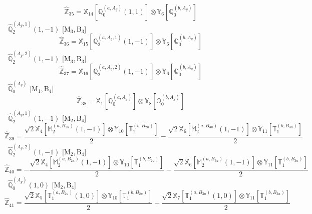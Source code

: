 \documentclass[fleqn,10pt,landscape]{article}
\begin{document}
\begin{itemize}
\begin{dmath*}
\hat{\mathbb{Z}}_{35}=\mathbb{X}_{14}[\mathbb{Q}_{0}^{(a,A_{g})}(1,1)] \otimes\mathbb{Y}_{6}[\mathbb{Q}_{0}^{(b,A_{g})}]
\end{dmath*}
\vspace{4mm}
\noindent {} $\,\,\,\hat{\mathbb{Q}}_{2}^{(A_{g},1)}(1,-1)$ [M$_{3}$,\,B$_{3}$]
\begin{dmath*}
\hat{\mathbb{Z}}_{36}=\mathbb{X}_{15}[\mathbb{Q}_{2}^{(a,A_{g},1)}(1,-1)] \otimes\mathbb{Y}_{6}[\mathbb{Q}_{0}^{(b,A_{g})}]
\end{dmath*}
\vspace{4mm}
\noindent {} $\,\,\,\hat{\mathbb{Q}}_{2}^{(A_{g},2)}(1,-1)$ [M$_{3}$,\,B$_{3}$]
\begin{dmath*}
\hat{\mathbb{Z}}_{37}=\mathbb{X}_{16}[\mathbb{Q}_{2}^{(a,A_{g},2)}(1,-1)] \otimes\mathbb{Y}_{6}[\mathbb{Q}_{0}^{(b,A_{g})}]
\end{dmath*}
\vspace{4mm}
\noindent {} $\,\,\,\hat{\mathbb{Q}}_{0}^{(A_{g})}$ [M$_{1}$,\,B$_{4}$]
\begin{dmath*}
\hat{\mathbb{Z}}_{38}=\mathbb{X}_{1}[\mathbb{Q}_{0}^{(a,A_{g})}] \otimes\mathbb{Y}_{8}[\mathbb{Q}_{0}^{(b,A_{g})}]
\end{dmath*}
\vspace{4mm}
\noindent {} $\,\,\,\hat{\mathbb{Q}}_{2}^{(A_{g},1)}(1,-1)$ [M$_{2}$,\,B$_{4}$]
\begin{dmath*}
\hat{\mathbb{Z}}_{39}=\frac{\sqrt{2} \mathbb{X}_{4}[\mathbb{M}_{2}^{(a,B_{2u})}(1,-1)] \otimes\mathbb{Y}_{10}[\mathbb{T}_{1}^{(b,B_{2u})}]}{2} - \frac{\sqrt{2} \mathbb{X}_{6}[\mathbb{M}_{2}^{(a,B_{3u})}(1,-1)] \otimes\mathbb{Y}_{11}[\mathbb{T}_{1}^{(b,B_{3u})}]}{2}
\end{dmath*}
\vspace{4mm}
\noindent {} $\,\,\,\hat{\mathbb{Q}}_{2}^{(A_{g},2)}(1,-1)$ [M$_{2}$,\,B$_{4}$]
\begin{dmath*}
\hat{\mathbb{Z}}_{40}=- \frac{\sqrt{2} \mathbb{X}_{4}[\mathbb{M}_{2}^{(a,B_{2u})}(1,-1)] \otimes\mathbb{Y}_{10}[\mathbb{T}_{1}^{(b,B_{2u})}]}{2} - \frac{\sqrt{2} \mathbb{X}_{6}[\mathbb{M}_{2}^{(a,B_{3u})}(1,-1)] \otimes\mathbb{Y}_{11}[\mathbb{T}_{1}^{(b,B_{3u})}]}{2}
\end{dmath*}
\vspace{4mm}
\noindent {} $\,\,\,\hat{\mathbb{Q}}_{0}^{(A_{g})}(1,0)$ [M$_{2}$,\,B$_{4}$]
\begin{dmath*}
\hat{\mathbb{Z}}_{41}=\frac{\sqrt{2} \mathbb{X}_{5}[\mathbb{T}_{1}^{(a,B_{2u})}(1,0)] \otimes\mathbb{Y}_{10}[\mathbb{T}_{1}^{(b,B_{2u})}]}{2} + \frac{\sqrt{2} \mathbb{X}_{7}[\mathbb{T}_{1}^{(a,B_{3u})}(1,0)] \otimes\mathbb{Y}_{11}[\mathbb{T}_{1}^{(b,B_{3u})}]}{2}

\end{dmath*}
\end{itemize}
\end{document}
